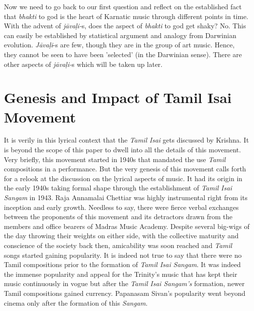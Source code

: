 Now we need to go back to our first question and reflect on the established fact that \textit{bhakti} to god is the heart of Karnatic music through different points in time. With the advent of \textit{jāvaḷi-}s, does the aspect of \textit{bhakti} to god get shaky? No. This can easily be established by statistical argument and analogy from Darwinian evolution. \textit{Jāvaḷi}-s are few, though they are in the group of art music. Hence, they cannot be seen to have been 'selected' (in the Darwinian sense). There are other aspects of \textit{jāvaḷi-}s which will be taken up later.

\vspace{-.2cm}

\section*{Genesis and Impact of Tamil Isai Movement}

\vspace{-.1cm}

It is verily in this lyrical context that the \textit{Tamil Isai} gets discussed by Krishna. It is beyond the scope of this paper to dwell into all the details of this movement. Very briefly, this movement started in 1940s that mandated the use \textit{Tamil} compositions in a performance. But the very genesis of this movement calls forth for a relook at the discussion on the lyrical aspects of music. It had its origin in the early 1940s taking formal shape through the establishment of \textit{Tamil Isai Sangam} in 1943. Raja Annamalai Chettiar was highly instrumental right from its inception and early growth. Needless to say, there were fierce verbal exchanges between the proponents of this movement and its detractors drawn from the members and office bearers of Madras Music Academy. Despite several big-wigs of the day throwing their weights on either side, with the collective maturity and conscience of the society back then, amicability was soon reached and \textit{Tamil} songs started gaining popularity. It is indeed not true to say that there were no Tamil compositions prior to the formation of \textit{Tamil Isai Sangam}. It was indeed the immense popularity and appeal for the Trinity’s music that has kept their music continuously in vogue but after the \textit{Tamil Isai Sangam’s} formation, newer Tamil compositions gained currency. Papanasam Sivan’s popularity went beyond cinema only after the formation of this \textit{Sangam}.

